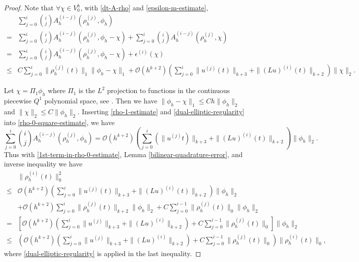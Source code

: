 \documentclass[onefignum,onetabnum]{siamart171218}
\begin{document}
\begin{proof}
Note that $\forall \chi \in V^h_0$, with \eqref{dt-A-rho} and \eqref{epsilon-m-estimate},
\begin{equation}\label{rho-0-square-estimate}
\begin{aligned}
& \sum_{j=0}^i {i\choose j} A_h^{(i-j)}(\rho^{(j)}_h, \phi_h) \\
= & \sum_{j=0}^i {i\choose j} A_h^{(i-j)}(\rho^{(j)}_h, \phi_h-\chi) + \sum_{j=0}^i {i\choose j} A_h^{(i-j)}(\rho^{(j)}_h, \chi)\\
= & \sum_{j=0}^i {i\choose j} A_h^{(i-j)}(\rho^{(j)}_h, \phi_h-\chi) + \epsilon^{(i)}( \chi) \\
\leq & C \sum_{j=0}^i \|\rho^{(j)}_h( t)\|_1\| \phi_h-\chi\|_1 +\mathcal O(h^{k+2})\left(\sum_{j=0}^i\|u^{(j)}( t)\|_{k+3}+\|(Lu)^{(i)}( t)\|_{k+2}\right)\|\chi\|_2.
\end{aligned}
\end{equation}

Let $\chi = \Pi_1 \phi_h$ where $\Pi_1$ is the $L^2$ projection to  functions in the  continuous piecewise $Q^1$ polynomial space, see \cite{li2020superconvergence}. Then we have $\| \phi_h-\chi\|_1 \leq Ch \|\phi_h\|_2$ and $\|\chi\|_2 \leq C\|\phi_h\|_2$.  Inserting  \eqref{rho-1-estimate} and \eqref{dual-elliptic-regularity} into \eqref{rho-0-square-estimate}, we have 
\begin{equation}\label{1st-term-in-rho-0-estimate}
\sum_{j=0}^i {i\choose j} A_h^{(i-j)}(\rho^{(j)}_h, \phi_h) = \mathcal O(h^{k+2})\left(\sum_{j=0}^i(\|u^{(j)} t)\|_{k+3}+\|(Lu)^{(i)}( t)\|_{k+2}\right)\|\phi_h\|_2.
\end{equation}
Thus with \eqref{1st-term-in-rho-0-estimate}, Lemma \ref{bilinear-quadrature-error}, and inverse inequality we have
\begin{equation}\label{rho-i-0-norm-estimation}
\begin{aligned}
 &  \|\rho^{(i)}_h(t)\|_0^2  \\
\leq & \mathcal O(h^{k+2})\left(\sum_{j=0}^i\|u^{(j)}( t)\|_{k+3}+\|(Lu)^{(i)}( t)\|_{k+2}\right)\|\phi_h\|_2 \\
&+ \mathcal O(h^{k+2})\sum_{j=0}^i\|\rho_h^{(j)}( t)\|_{k+2}\|\phi_h\|_2
  + C\sum_{j=0}^{i-1}\|\rho_h^{(j)}( t)\|_0\|\phi_h\|_2\\
= & \left[\mathcal O(h^{k+2})\left(\sum_{j=0}^i\|u^{(j)}\|_{k+3}+\|(Lu)^{(i)}\|_{k+2} \right) + C\sum_{j=0}^{i-1}\|\rho_h^{(j)}(t)\|_0\right]\|\phi_h\|_2\\
\leq & \left(\mathcal O(h^{k+2})\left(\sum_{j=0}^i\|u^{(j)}\|_{k+3}+\|(Lu)^{(i)}\|_{k+2} \right) + C\sum_{j=0}^{i-1}\|\rho_h^{(j)}(t)\|_0\right)\|\rho^{(i)}_h(t)\|_0,
\end{aligned}
\end{equation}
where \eqref{dual-elliptic-regularity} is applied in the last inequality.


\end{proof}
\end{document}
